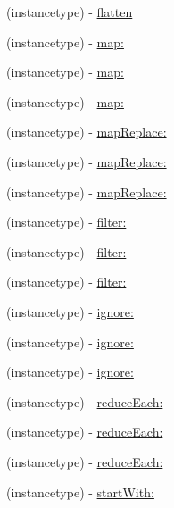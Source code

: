 \begin{DoxyCompactItemize}
\item 
(instancetype) -\/ \mbox{\hyperlink{interface_r_a_c_stream_a02767823dfe3d4682709e066e15e388c}{flatten}}
\item 
(instancetype) -\/ \mbox{\hyperlink{interface_r_a_c_stream_ae8e14cc70fb3979e6128d28b003bba3f}{map\+:}}
\item 
(instancetype) -\/ \mbox{\hyperlink{interface_r_a_c_stream_ae8e14cc70fb3979e6128d28b003bba3f}{map\+:}}
\item 
(instancetype) -\/ \mbox{\hyperlink{interface_r_a_c_stream_ae8e14cc70fb3979e6128d28b003bba3f}{map\+:}}
\item 
(instancetype) -\/ \mbox{\hyperlink{interface_r_a_c_stream_a9e55da434f4cf84e14f9133ac48383b8}{map\+Replace\+:}}
\item 
(instancetype) -\/ \mbox{\hyperlink{interface_r_a_c_stream_a9e55da434f4cf84e14f9133ac48383b8}{map\+Replace\+:}}
\item 
(instancetype) -\/ \mbox{\hyperlink{interface_r_a_c_stream_a9e55da434f4cf84e14f9133ac48383b8}{map\+Replace\+:}}
\item 
(instancetype) -\/ \mbox{\hyperlink{interface_r_a_c_stream_ae6a990d05708acea33f1c31102f4989b}{filter\+:}}
\item 
(instancetype) -\/ \mbox{\hyperlink{interface_r_a_c_stream_ae6a990d05708acea33f1c31102f4989b}{filter\+:}}
\item 
(instancetype) -\/ \mbox{\hyperlink{interface_r_a_c_stream_ae6a990d05708acea33f1c31102f4989b}{filter\+:}}
\item 
(instancetype) -\/ \mbox{\hyperlink{interface_r_a_c_stream_aa0bf73c86006176e745390ee2b3645b2}{ignore\+:}}
\item 
(instancetype) -\/ \mbox{\hyperlink{interface_r_a_c_stream_aa0bf73c86006176e745390ee2b3645b2}{ignore\+:}}
\item 
(instancetype) -\/ \mbox{\hyperlink{interface_r_a_c_stream_aa0bf73c86006176e745390ee2b3645b2}{ignore\+:}}
\item 
(instancetype) -\/ \mbox{\hyperlink{interface_r_a_c_stream_aaf04bf295d943b85860ae5cc3d5851ff}{reduce\+Each\+:}}
\item 
(instancetype) -\/ \mbox{\hyperlink{interface_r_a_c_stream_aaf04bf295d943b85860ae5cc3d5851ff}{reduce\+Each\+:}}
\item 
(instancetype) -\/ \mbox{\hyperlink{interface_r_a_c_stream_aaf04bf295d943b85860ae5cc3d5851ff}{reduce\+Each\+:}}
\item 
(instancetype) -\/ \mbox{\hyperlink{interface_r_a_c_stream_a2f255fad695085b91a1ebc1e0a78c865}{start\+With\+:}}

\end{DoxyCompactItemize}
